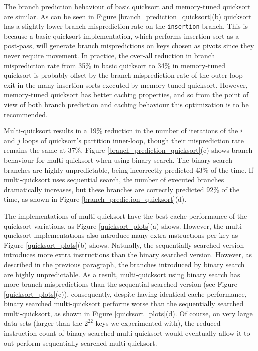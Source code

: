 \documentclass[acmtocl]{acmtrans2m}
\begin{document}
The branch prediction behaviour of basic quicksort and memory-tuned quicksort are similar.
As can be seen in Figure \ref{branch_prediction_quicksort}(b) 
quicksort has a slightly lower branch misprediction rate on the \texttt{insertion} branch. This
is because a basic quicksort implementation, which performs insertion sort as a post-pass,
will generate branch mispredictions on keys chosen as pivots since they never require movement.
In practice, the over-all reduction in branch misprediction rate from 35\% in basic quicksort
to 34\% in memory-tuned quicksort is probably offset by the branch misprediction rate of the
outer-loop exit in the many insertion sorts executed by memory-tuned quicksort. However,
memory-tuned quicksort has better caching properties, and so from the point of view of both
branch prediction and caching behaviour this optimization is to be recommended. 

Multi-quicksort results in a 19\% reduction in the number of iterations of the $i$ and $j$
loops of quicksort's partition inner-loop, 
though their misprediction rate remains the same at 37\%. Figure \ref{branch_prediction_quicksort}(c) shows branch behaviour
for multi-quicksort when using binary search. The binary search branches are highly unpredictable,
being incorrectly predicted 43\% of the time. If multi-quicksort uses sequential search, the
number of executed branches dramatically increases, but these
branches are correctly predicted 92\% of the time, as shown in Figure \ref{branch_prediction_quicksort}(d). 

The implementations of multi-quicksort have the best cache performance of the quicksort variations, as Figure \ref{quicksort_plots}(a) shows.
However, the multi-quicksort implementations also introduce many extra instructions per key as Figure \ref{quicksort_plots}(b) shows. Naturally, the 
sequentially searched version introduces more extra instructions than the binary searched version. However, as described in the previous paragraph,
the branches introduced by binary search are highly unpredictable. As a result, multi-quicksort using binary search has more branch mispredictions than the
sequential searched version (see Figure \ref{quicksort_plots}(c)), consequently, despite having identical cache performance, binary searched multi-quicksort
performs worse than the sequentially searched multi-quicksort, as shown in Figure \ref{quicksort_plots}(d). Of course, on very large data sets (larger than the $2^{22}$ keys we experimented with), the 
reduced instruction count of binary searched multi-quicksort would eventually allow it to out-perform sequentially searched multi-quicksort.
\end{document}
